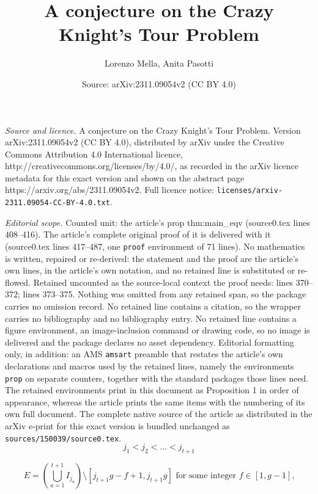 \documentclass[10pt,a4paper]{amsart}
\title{A conjecture on the Crazy Knight's Tour Problem}
\author{Lorenzo Mella, Anita Pasotti}
\date{Source: arXiv:2311.09054v2 (CC BY 4.0)}
\begin{document}
\maketitle

\noindent\emph{Source and licence.} A conjecture on the Crazy Knight's Tour Problem. Version arXiv:2311.09054v2 (CC BY 4.0), distributed by arXiv under the Creative Commons Attribution 4.0 International licence, http://creativecommons.org/licenses/by/4.0/, as recorded in the arXiv licence metadata for this exact version and shown on the abstract page https://arxiv.org/abs/2311.09054v2. Full licence notice: \texttt{licenses/arxiv-2311.09054-CC-BY-4.0.txt}.\par\smallskip

\noindent\textit{Editorial scope.} Counted unit: the article's prop thm:main\_eqv (source0.tex lines 408--416). The article's complete original proof of it is delivered with it (source0.tex lines 417--487, one \texttt{proof} environment of 71 lines). No mathematics is written, repaired or re-derived: the statement and the proof are the article's own lines, in the article's own notation, and no retained line is substituted or re-flowed.  Retained uncounted as the source-local context the proof needs: lines 370--372; lines 373--375.  Nothing was omitted from any retained span, so the package carries no omission record.  No retained line contains a citation, so the wrapper carries no bibliography and no bibliography entry.  No retained line contains a figure environment, an image-inclusion command or drawing code, so no image is delivered and the package declares no asset dependency.  Editorial formatting only, in addition: an AMS \texttt{amsart} preamble that restates the article's own declarations and macros used by the retained lines, namely the environments \texttt{prop} on separate counters, together with the standard packages those lines need.  The retained environments print in this document as Proposition 1 in order of appearance, whereas the article prints the same items with the numbering of its own full document.  The complete native source of the article as distributed in the arXiv e-print for this exact version is bundled unchanged as \texttt{sources/150039/source0.tex}.
\begin{equation}\label{eq:cond1}
    j_1 < j_2 < \dotsc < j_{t+1} 
\end{equation}

\begin{equation} \label{eq:cond2}
\text{$E = \left(\bigcup_{a=1}^{t+1} I_{j_a}\right)  \setminus [j_{t+1}g-f+1, j_{t+1}g]$  for some integer $f \in [1,g-1]$,}
\end{equation}
\end{document}
